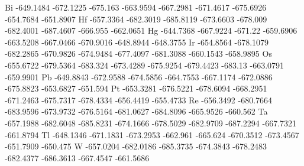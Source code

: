 Bi	-649.1484	-672.1225	-675.163	-663.9594	-667.2981	-671.4617	-675.6926	-654.7684	-651.8907
Hf	-657.3364	-682.3019	-685.8119	-673.6603	-678.009	-682.4001	-687.4607	-666.955	-662.0651
Hg	-644.7368	-667.9224	-671.22	-659.6906	-663.5208	-667.0466	-670.9016	-648.8944	-648.3755
Ir	-654.8564	-678.1079	-682.2865	-670.9826	-674.9484	-677.4097	-681.3088	-660.1543	-658.9895
Os	-655.6722	-679.5364	-683.324	-673.4289	-675.9254	-679.4423	-683.13	-663.0791	-659.9901
Pb	-649.8843	-672.9588	-674.5856	-664.7553	-667.1174	-672.0886	-675.8823	-653.6827	-651.594
Pt	-653.3281	-676.5221	-678.6094	-668.2951	-671.2463	-675.7317	-678.4334	-656.4419	-655.4733
Re	-656.3492	-680.7664	-683.9596	-673.9732	-676.5164	-681.0627	-684.8096	-665.9526	-660.562
Ta	-657.1988	-682.6048	-685.8231	-674.1666	-678.5029	-682.9709	-687.2294	-667.7321	-661.8794
Tl	-648.1346	-671.1831	-673.2953	-662.961	-665.624	-670.3512	-673.4567	-651.7909	-650.475
W	-657.0204	-682.0186	-685.3735	-674.3843	-678.2483	-682.4377	-686.3613	-667.4547	-661.5686


